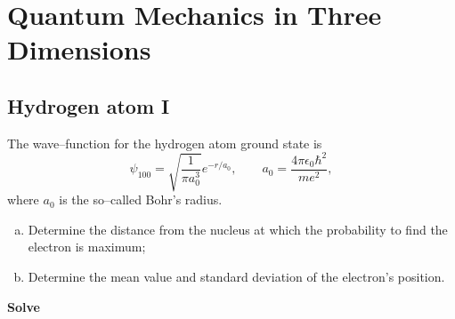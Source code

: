 \section{Quantum Mechanics in Three Dimensions}
\subsection{Hydrogen atom I}
The wave--function for the hydrogen atom ground state is
\begin{equation}
    \psi_{100} = \sqrt{\frac{1}{\pi a_0^3}} e^{-r/a_0}, \qquad a_0 = \frac{4 \pi \epsilon_0 \hbar^2}{m e^2},
\end{equation}
where $a_0$ is the so--called Bohr's radius.
\begin{enumerate}[(a)]
    \item Determine the distance from the nucleus at which the probability to find the electron is maximum;
    \item Determine the mean value and standard deviation of the electron's position.
\end{enumerate}

\textbf{Solve}

